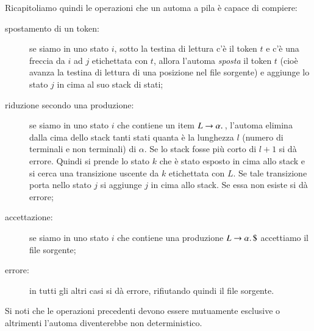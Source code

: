 Ricapitoliamo quindi le operazioni che un automa a pila \`e capace di compiere:
%
\begin{description}
\item[spostamento di un token:] se siamo in uno stato $i$, sotto la
  testina di lettura c'\`e il token $t$ e c'\`e una freccia da $i$ ad
  $j$ etichettata con $t$, allora l'automa \emph{sposta} il token $t$
  (cio\`e avanza la testina di lettura di una posizione nel file sorgente)
  e aggiunge lo stato $j$ in cima al suo stack di stati;
\item[riduzione secondo una produzione:] se siamo in uno stato $i$ che
  contiene un item $L\to\alpha.\,$, l'automa elimina dalla cima dello stack
  tanti stati quanta \`e la lunghezza $l$ (numero di terminali e non terminali)
  di $\alpha$. Se lo stack fosse pi\`u corto di $l+1$ si d\`a errore. Quindi
  si prende lo stato $k$ che \`e stato esposto in cima allo stack e si cerca
  una transizione uscente da $k$ etichettata con $L$. Se tale transizione
  porta nello stato $j$ si aggiunge $j$ in cima allo stack. Se essa non
  esiste si d\`a errore;
\item[accettazione:] se siamo in uno stato $i$ che contiene una produzione
  $L\to\alpha.\,\mathtt{\$}$ accettiamo il file sorgente;
\item[errore:] in tutti gli altri casi si d\`a errore, rifiutando quindi il
  file sorgente.
\end{description}
%
Si noti che le operazioni precedenti devono essere mutuamente esclusive
o altrimenti l'automa diventerebbe non deterministico.

